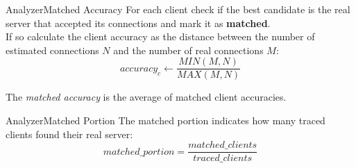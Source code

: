 	\begin{frame}{Analyzer}{Matched Accuracy}
		For each client check if the best candidate is the real server
that accepted its connections and mark it as \textbf{matched}.\\
		\vspace{20pt}
		If so calculate the client accuracy as the distance between the
number of estimated connections $N$ and the number of real connections
$M$:
	\begin{equation}
		 accuracy_c \gets \frac{ MIN(M, N)}{MAX(M, N)}
	\end{equation}
	
	The \emph{matched accuracy} is the average of matched client accuracies.
	
	\end{frame}

	\begin{frame}{Analyzer}{Matched Portion}
		The matched portion indicates how many traced clients 
 			found their real server:
		\begin{equation}
			matched\_portion = \frac{matched\_clients}{traced\_clients}
		\end{equation}
	\end{frame}
